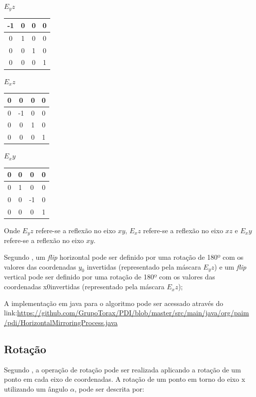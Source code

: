 \documentclass[
	12pt,				%
	oneside,			%
	a4paper,			%
	english,			%
	french,				%
	spanish,			%
	brazil,				%
	]{abntex2}
\begin{document}
\(E_yz\)
\begin{tabular}{|c|c|c|c|}
	\hline
    -1 & 0 & 0 & 0   \\ \hline
	 0 & 1 & 0 & 0   \\ \hline   
	 0 & 0 & 1 & 0   \\ \hline   
	 0 & 0 & 0 & 1   \\ \hline   
\end{tabular}
\(E_xz\)
\begin{tabular}{|c|c|c|c|}
	\hline
    0 &  0 & 0 & 0   \\ \hline
	0 & -1 & 0 & 0   \\ \hline   
	0 &  0 & 1 & 0   \\ \hline   
	0 &  0 & 0 & 1   \\ \hline   
\end{tabular}
\(E_xy\)
\begin{tabular}{|c|c|c|c|}
	\hline
    0 & 0 &  0 & 0   \\ \hline
	0 & 1 &  0 & 0   \\ \hline   
	0 & 0 & -1 & 0   \\ \hline   
	0 & 0 &  0 & 1   \\ \hline   
\end{tabular}

Onde \(E_yz\) refere-se a reflexão no eixo \(xy\), \(E_xz\) refere-se a reflexão no eixo \(xz\) e \(E_xy\) refere-se a reflexão no eixo \(xy\).

Segundo \citet{conciAzevedoLeta:2008}, um \textit{flip} horizontal pode ser definido por uma rotação de 180º com os valores das coordenadas \(y_0\) invertidas (representado pela máscara \(E_yz\)) e um \textit{flip} vertical pode ser definido por uma rotação de 180º com os valores das coordenadas x0invertidas (representado pela máscara \(E_xz\));

A implementação em java para o algoritmo pode ser acessado através do link:\url{https://github.com/GrupoTorax/PDI/blob/master/src/main/java/org/paim/pdi/HorizontalMirroringProcess.java}

\subsection{Rotação}

Segundo \citet{pedriniSchwartz:2008}, a operação de rotação pode ser realizada aplicando a rotação de um ponto em cada eixo de coordenadas. A rotação de um ponto em torno do eixo x utilizando um ângulo \(\alpha\), pode ser descrita por:
\end{document}
